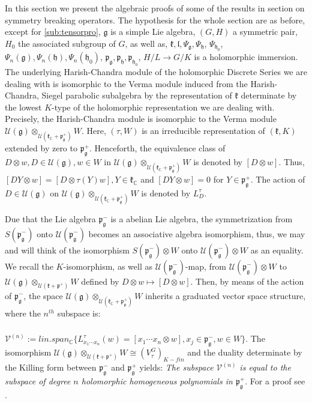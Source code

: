 \documentclass[12pt]{amsart}
\theoremstyle{definition}
\theoremstyle{remark}
\newcommand{\g}{\mathfrak{g}}
\newcommand{\h}{\mathfrak{h}}
\renewcommand{\k}{{\mathfrak k}}
\renewcommand{\l}{\mathfrak l}
\newcommand{\p}{\mathfrak p}
\newcommand{\C}{{\mathbb C}}
\numberwithin{equation}{section}
\begin{document}
In this section we present the algebraic  proofs of some of the results in section on symmetry breaking operators. The hypothesis for the whole section are as before, except for   \ref{sub:tensorpro}, $\g$ is a simple Lie algebra, $(G,H)$ a symmetric pair, $H_0$ the associated subgroup of $G$, as well as,  $\k,\l, \Psi_\g, \Psi_\h$, $\Psi_{\h_0}$, $\Psi_n(\g), \Psi_n(\h), \Psi_n(\h_0)$, $\p_\g, \p_\h, \p_{\h_0}$, $H/L\rightarrow G/K$ is a holomorphic immersion. The underlying Harish-Chandra module of the holomorphic Discrete Series we are dealing with is isomorphic to the Verma module induced from the Harish-Chandra, Siegel parabolic subalgebra by the representation of $\k$ determinate by the lowest $K$-type of the holomorphic representation we are dealing with. Precisely, the Harish-Chandra module is isomorphic to the Verma module   $\mathcal U(\g)\otimes_{\mathcal U(\k_\C +\p_\g ^+)} W$. Here, $(\tau, W)$ is an irreducible representation of $(\k,K)$ extended by zero to $\p_\g ^+$. Henceforth, the equivalence class of $D\otimes w, D \in \mathcal U(\g), w \in W$ in  $\mathcal U(\g)\otimes_{\mathcal U(\k_\C +\p_\g ^+)} W$ is denoted by $[D\otimes w]$. Thus, $[DY\otimes w] =[D\otimes \tau (Y)w], Y \in \k_\C$ and $[DY\otimes w] =0$ for $Y\in \p_\g^+$. The action of $D\in \mathcal U(\g)$ on $\mathcal U(\g)\otimes_{\mathcal U(\k_\C +\p_\g ^+)} W$ is denoted by $L_D^\tau$.







     Due that the Lie algebra $\p_\g^-$  is a abelian Lie algebra, the symmetrization from $S(\p_\g^-)$ onto $\mathcal U(\p_\g^-)$ becomes an associative algebra isomorphism, thus, we may and will think of the isomorphism $S(\p_\g^-)\otimes W$ onto $\mathcal U(\p_\g^-)\otimes W$ as an equality.    We recall   the $K$-isomorphism, as well as $\mathcal U(\p_\g^-)$-map,   from $\mathcal U(\p_\g^-)\otimes W $ to $\mathcal U(\g)\otimes_{\mathcal U(\k +\p^+)} W $ defined by  $D\otimes w \mapsto [D\otimes w]$.
     Then,  by means of the action   of $\p_\g^-$,  the space $\mathcal U(\g)\otimes_{\mathcal U(\k_\C +\p_\g ^+)} W$  inherits    a  graduated vector space structure, where the $n^{th}$ subspace is:
\subsubsection{}\label{sub:vn}
     $\mathcal V^{(n)}:=lin.span_\C \{L_{x_1\cdots x_n}^\tau (w)=[x_1\cdots x_n \otimes w], x_j \in \p_\g^-, w\in W\}$. The isomorphism  $ \mathcal U(\g)\otimes_{\mathcal U(\k +\p^+)} W \cong (V_\tau^G)_{K-fin}$ and the duality determinate by the Killing form between $\p_\g^-$ and $\p_\g^+$ yields:   {\it The subspace  $\mathcal V^{(n)}$ is equal to the subspace of degree $n$ holomorphic homogeneous polynomials in $\p_\g^+$}. For a proof see \cite{JV}.
\end{document}
